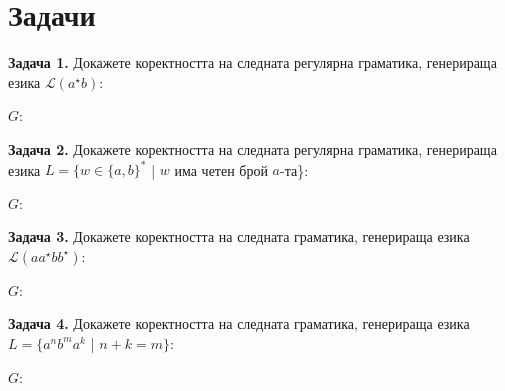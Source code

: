 \documentclass{article}
\begin{document}
\section{Задачи}
    \textbf{Задача 1.} Докажете коректността на следната регулярна граматика, генерираща
    езика $\mathscr{L}(a^{\star}b)$: \\
    \begin{center}
        $G$: 
    \end{center}

    \vspace{15pt}

    \textbf{Задача 2.} Докажете коректността на следната регулярна граматика, генерираща
    езика $L = \{w \in \{a,b\}^*$ | $w$ има четен брой $a$-та\}: \\
    \begin{center}
        $G$: 
    \end{center}

    \vspace{15pt}

    \textbf{Задача 3.} Докажете коректността на следната граматика, генерираща
    езика $\mathscr{L}(aa^{\star}bb^{\star})$: \\
    \begin{center}
        $G$: 
    \end{center}

    \vspace{15pt}

    \textbf{Задача 4.} Докажете коректността на следната граматика, генерираща
    езика $L = \{a^nb^ma^k$ | $n+k = m\}$: \\
    \begin{center}
        $G$: 
    \end{center}
\vspace{25pt}
\end{document}
